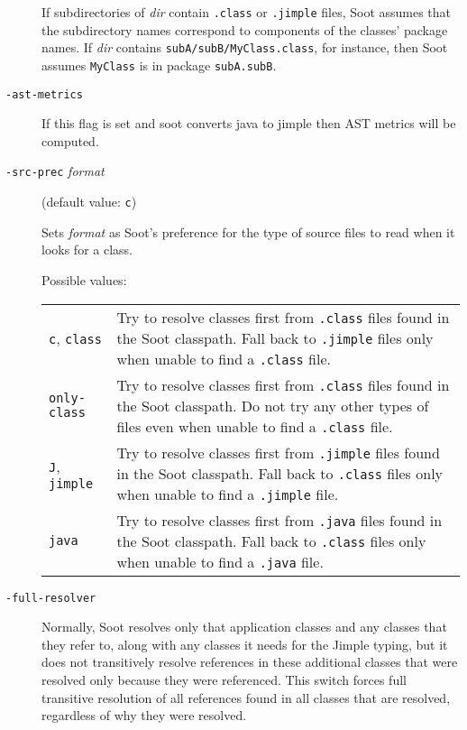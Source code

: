 \documentclass{article}
\begin{document}
\begin{description}
\par

If subdirectories of {\it dir} contain {\tt .class} or
{\tt .jimple} files, Soot assumes that the subdirectory names
correspond to components of the classes' package names. If
{\it dir} contains {\tt subA/subB/MyClass.class}, for
instance, then Soot assumes {\tt MyClass} is in package
{\tt subA.subB}.



  \item[
  {\tt -ast-metrics}]

			If this flag is set and soot converts java to jimple then AST metrics will be computed.
	


  \item[
  {\tt -src-prec}{ \it format}]

(default value: {\tt c})

Sets {\it format} as Soot's preference for the type of source files to read when
it looks for a class.




Possible values:\\
\begin{longtable}{p{1in}p{4in}}
{\tt c}, {\tt class} 
&

Try to resolve classes first from {\tt .class} files found in
the Soot classpath.  Fall back to {\tt .jimple} files
only when unable to find a {\tt .class} file.
\\
{\tt only-class} 
&

Try to resolve classes first from {\tt .class} files found in
the Soot classpath.  Do not try any other types of files even when
unable to find a {\tt .class} file.
\\
{\tt J}, {\tt jimple} 
&

Try to resolve classes first from {\tt .jimple} files found in
the Soot classpath.  Fall back to {\tt .class} files only when
unable to find a {\tt .jimple} file.
\\
{\tt java} 
&

Try to resolve classes first from {\tt .java} files found in
the Soot classpath.  Fall back to {\tt .class} files only when
unable to find a {\tt .java} file.
\\

\end{longtable}


  \item[
  {\tt -full-resolver}]

Normally, Soot resolves only that application classes and any classes that they
refer to, along with any classes it needs for the Jimple typing, but it does not
transitively resolve references in these additional classes that were resolved
only because they were referenced. This switch forces full transitive resolution
of all references found in all classes that are resolved, regardless of why they
were resolved.


\end{description}
\end{document}
